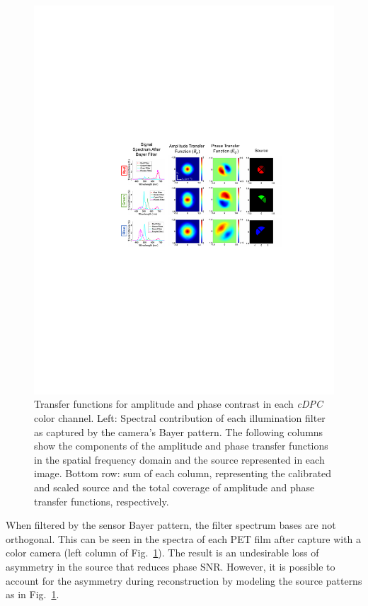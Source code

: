\begin{figure}[tbh]
\centering
\includegraphics[width=\textwidth]{figures/fig_cdpc_transferfuncs.pdf}
\caption{\label{fig:transferfunctions}
Transfer functions for amplitude and phase contrast in each \textit{cDPC} color channel. Left: Spectral contribution of each illumination filter as captured by the camera's Bayer pattern. The following columns show the components of the amplitude and phase transfer functions in the spatial frequency domain and the source represented in each image.  Bottom row: sum of each column, representing the calibrated and scaled source and the total coverage of amplitude and phase transfer functions, respectively. }
\end{figure}

When filtered by the sensor Bayer pattern, the filter spectrum bases are not orthogonal. This can be seen in the spectra of each PET film after capture with a color camera (left column of Fig.~\ref{fig:transferfunctions}). The result is an undesirable loss of asymmetry in the source that reduces phase SNR. However, it is possible to account for the asymmetry during reconstruction by modeling the source patterns as in Fig.~\ref{fig:transferfunctions}.

